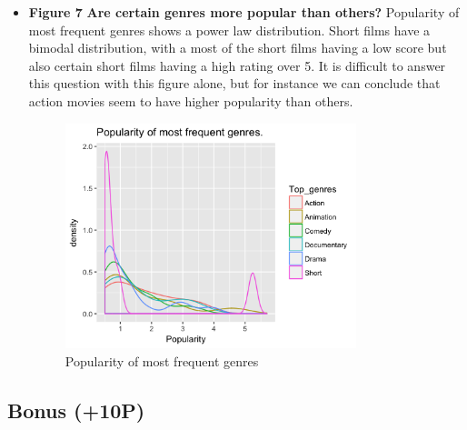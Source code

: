 \documentclass[a4paper]{article}
\begin{document}
\begin{itemize}
		
		\item \textbf{Figure 7} 
		\textbf{Are certain genres more popular than others?}
		Popularity of most frequent genres shows a power law distribution. Short films have a bimodal distribution, with a most of the short films having a low score but also certain short films having a high rating over 5. It is difficult to answer this question with this figure alone, but for instance we can conclude that action movies seem to have higher popularity than others.
		\begin{figure}[h]
		\begin{center}
		\includegraphics[width=0.8\textwidth]{fig_7_popularity_top_genres}
		\caption{Popularity of most frequent genres}
		\label{fig:f7}
		\end{center}
		\end{figure}   
	\end{itemize}
		
	\subsection{Bonus (+10P)}
	
\end{document}
